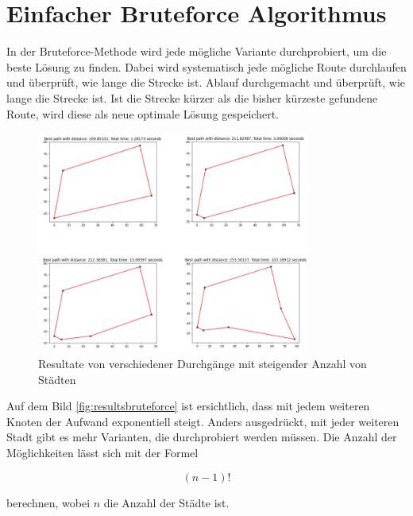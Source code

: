 %
%
%
%
\section{Einfacher Bruteforce Algorithmus
\label{buch:paper:varalg:section:bruteforce}}
In der Bruteforce-Methode wird jede mögliche Variante durchprobiert, 
um die beste Lösung zu finden. Dabei wird systematisch jede mögliche
Route durchlaufen und überprüft, wie lange die Strecke ist.  
Ablauf durchgemacht und überprüft, wie lange die Strecke ist.
Ist die Strecke kürzer als die bisher kürzeste gefundene Route, 
wird diese als neue optimale Lösung gespeichert.

\begin{figure}
    \centering
    \includegraphics[width=0.8\textwidth]{
        papers/varalg/images/teil2/02BruteforceMethode.png
    }
    \caption{Resultate von verschiedener Durchgänge mit steigender Anzahl von Städten}
    \label{fig:results_bruteforce}
\end{figure}

Auf dem Bild \ref{fig:resultsbruteforce} ist ersichtlich, dass mit 
jedem weiteren Knoten der Aufwand exponentiell steigt. Anders 
ausgedrückt, mit jeder weiteren Stadt gibt es mehr Varianten, die 
durchprobiert werden müssen. Die Anzahl der Möglichkeiten lässt sich 
mit der Formel

\begin{equation}
    (n-1)!
\end{equation}

berechnen, wobei \(n\) die Anzahl der Städte ist.

